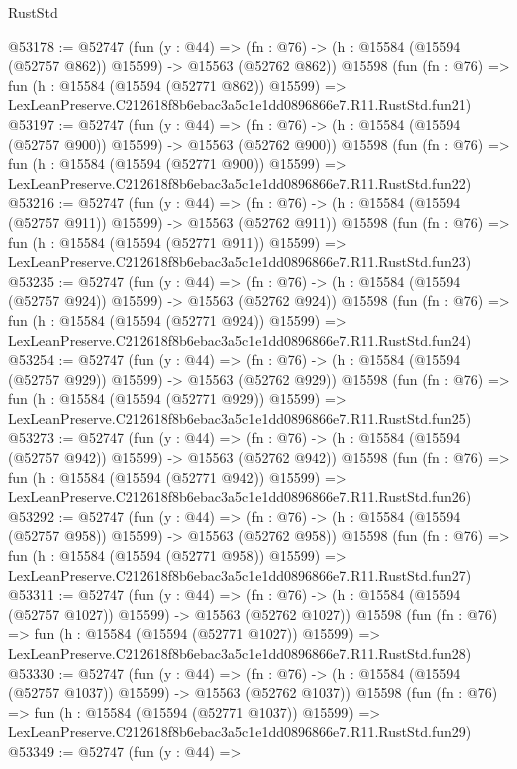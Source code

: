 \begin{lexlean}{RustStd}
\begin{coremodule}
@53178 := @52747
    (fun (y : @44) =>
    (fn : @76) -> (h : @15584 (@15594 (@52757 @862)) @15599) -> @15563 (@52762 @862))
    @15598
    (fun (fn : @76) =>
    fun (h : @15584 (@15594 (@52771 @862)) @15599) =>
    LexLeanPreserve.C212618f8b6ebac3a5c1e1dd0896866e7.R11.RustStd.fun21)
@53197 := @52747
    (fun (y : @44) =>
    (fn : @76) -> (h : @15584 (@15594 (@52757 @900)) @15599) -> @15563 (@52762 @900))
    @15598
    (fun (fn : @76) =>
    fun (h : @15584 (@15594 (@52771 @900)) @15599) =>
    LexLeanPreserve.C212618f8b6ebac3a5c1e1dd0896866e7.R11.RustStd.fun22)
@53216 := @52747
    (fun (y : @44) =>
    (fn : @76) -> (h : @15584 (@15594 (@52757 @911)) @15599) -> @15563 (@52762 @911))
    @15598
    (fun (fn : @76) =>
    fun (h : @15584 (@15594 (@52771 @911)) @15599) =>
    LexLeanPreserve.C212618f8b6ebac3a5c1e1dd0896866e7.R11.RustStd.fun23)
@53235 := @52747
    (fun (y : @44) =>
    (fn : @76) -> (h : @15584 (@15594 (@52757 @924)) @15599) -> @15563 (@52762 @924))
    @15598
    (fun (fn : @76) =>
    fun (h : @15584 (@15594 (@52771 @924)) @15599) =>
    LexLeanPreserve.C212618f8b6ebac3a5c1e1dd0896866e7.R11.RustStd.fun24)
@53254 := @52747
    (fun (y : @44) =>
    (fn : @76) -> (h : @15584 (@15594 (@52757 @929)) @15599) -> @15563 (@52762 @929))
    @15598
    (fun (fn : @76) =>
    fun (h : @15584 (@15594 (@52771 @929)) @15599) =>
    LexLeanPreserve.C212618f8b6ebac3a5c1e1dd0896866e7.R11.RustStd.fun25)
@53273 := @52747
    (fun (y : @44) =>
    (fn : @76) -> (h : @15584 (@15594 (@52757 @942)) @15599) -> @15563 (@52762 @942))
    @15598
    (fun (fn : @76) =>
    fun (h : @15584 (@15594 (@52771 @942)) @15599) =>
    LexLeanPreserve.C212618f8b6ebac3a5c1e1dd0896866e7.R11.RustStd.fun26)
@53292 := @52747
    (fun (y : @44) =>
    (fn : @76) -> (h : @15584 (@15594 (@52757 @958)) @15599) -> @15563 (@52762 @958))
    @15598
    (fun (fn : @76) =>
    fun (h : @15584 (@15594 (@52771 @958)) @15599) =>
    LexLeanPreserve.C212618f8b6ebac3a5c1e1dd0896866e7.R11.RustStd.fun27)
@53311 := @52747
    (fun (y : @44) =>
    (fn : @76) -> (h : @15584 (@15594 (@52757 @1027)) @15599) -> @15563 (@52762 @1027))
    @15598
    (fun (fn : @76) =>
    fun (h : @15584 (@15594 (@52771 @1027)) @15599) =>
    LexLeanPreserve.C212618f8b6ebac3a5c1e1dd0896866e7.R11.RustStd.fun28)
@53330 := @52747
    (fun (y : @44) =>
    (fn : @76) -> (h : @15584 (@15594 (@52757 @1037)) @15599) -> @15563 (@52762 @1037))
    @15598
    (fun (fn : @76) =>
    fun (h : @15584 (@15594 (@52771 @1037)) @15599) =>
    LexLeanPreserve.C212618f8b6ebac3a5c1e1dd0896866e7.R11.RustStd.fun29)
@53349 := @52747
    (fun (y : @44) =>

\end{coremodule}
\end{lexlean}
